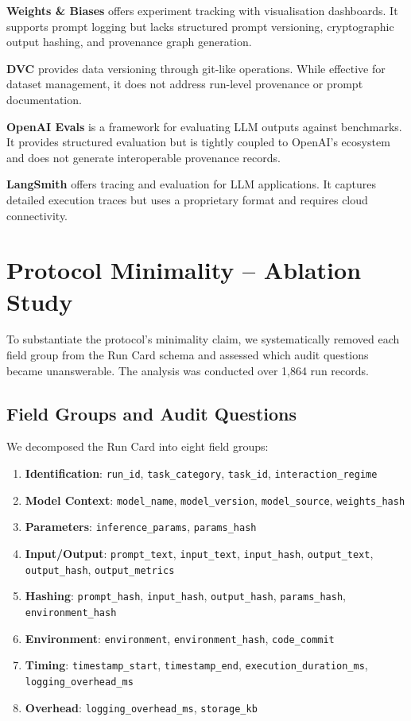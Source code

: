 \documentclass[11pt]{article}
\begin{document}
\noindent \textbf{Weights \& Biases} offers experiment tracking with visualisation dashboards. It supports prompt logging but lacks structured prompt versioning, cryptographic output hashing, and provenance graph generation.

\noindent \textbf{DVC} provides data versioning through git-like operations. While effective for dataset management, it does not address run-level provenance or prompt documentation.

\noindent \textbf{OpenAI Evals} is a framework for evaluating LLM outputs against benchmarks. It provides structured evaluation but is tightly coupled to OpenAI's ecosystem and does not generate interoperable provenance records.

\noindent \textbf{LangSmith} offers tracing and evaluation for LLM applications. It captures detailed execution traces but uses a proprietary format and requires cloud connectivity.


\section{Protocol Minimality -- Ablation Study}
\label{sec:s6}

To substantiate the protocol's minimality claim, we systematically removed each field group from the Run Card schema and assessed which audit questions became unanswerable. The analysis was conducted over 1,864 run records.

\subsection{Field Groups and Audit Questions}

We decomposed the Run Card into eight field groups:

\begin{enumerate}[noitemsep]
    \item \textbf{Identification}: \texttt{run\_id}, \texttt{task\_category}, \texttt{task\_id}, \texttt{interaction\_regime}
    \item \textbf{Model Context}: \texttt{model\_name}, \texttt{model\_version}, \texttt{model\_source}, \texttt{weights\_hash}
    \item \textbf{Parameters}: \texttt{inference\_params}, \texttt{params\_hash}
    \item \textbf{Input/Output}: \texttt{prompt\_text}, \texttt{input\_text}, \texttt{input\_hash}, \texttt{output\_text}, \texttt{output\_hash}, \texttt{output\_metrics}
    \item \textbf{Hashing}: \texttt{prompt\_hash}, \texttt{input\_hash}, \texttt{output\_hash}, \texttt{params\_hash}, \texttt{environment\_hash}
    \item \textbf{Environment}: \texttt{environment}, \texttt{environment\_hash}, \texttt{code\_commit}
    \item \textbf{Timing}: \texttt{timestamp\_start}, \texttt{timestamp\_end}, \texttt{execution\_duration\_ms}, \texttt{logging\_overhead\_ms}
    \item \textbf{Overhead}: \texttt{logging\_overhead\_ms}, \texttt{storage\_kb}
\end{enumerate}
\end{document}
